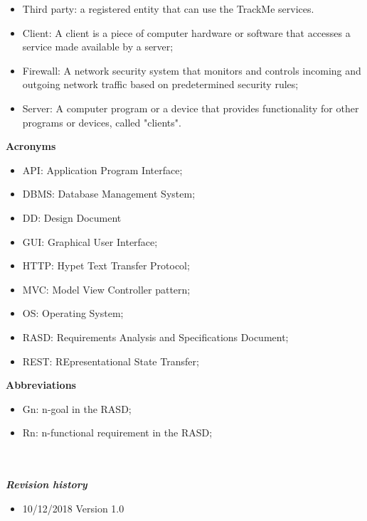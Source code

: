 \begin{legal}
\begin{legal}
\begin{itemize}
					\item Third party: a registered entity that can use the TrackMe services.
					\item Client: A client is a piece of computer hardware or software that accesses a service made available by a server;
					\item Firewall: A network security system that monitors and controls incoming and outgoing network traffic based on predetermined security rules;
					\item Server: A computer program or a device that provides functionality for other programs or devices, called "clients".\\
				\end{itemize}
				\item \textbf{Acronyms}\\
				\begin{itemize}
					\item API: Application Program Interface;
					\item DBMS: Database Management System;
					\item DD: Design Document
					\item GUI: Graphical User Interface;
					\item HTTP: Hypet Text Transfer Protocol;
					\item MVC: Model View Controller pattern;
					\item OS: Operating System;
					\item RASD: Requirements Analysis and Specifications Document;
					\item REST: REpresentational State Transfer;\\
				\end{itemize}
				\item \textbf{Abbreviations}\\
				\begin{itemize}
					\item Gn: n-goal in the RASD;
					\item Rn: n-functional requirement in the RASD;\\\\\\
				\end{itemize}
			\end{legal}
		\item \textit{\textbf{Revision history}}\\
			\begin{itemize}
				\item 10/12/2018		Version 1.0\\

\end{itemize}
\end{legal}
